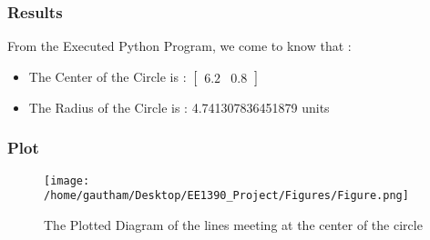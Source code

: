 \documentclass{beamer}
\begin{document}
\begin{frame}
\frametitle{Results}
From the Executed Python Program, we come to know that :
\begin{itemize}
\item<1->The Center of the Circle is : $\begin{bmatrix} 6.2 & 0.8
\end{bmatrix}$
\item<2-> The Radius of the Circle is : 4.741307836451879 units
\end{itemize}\textsl{}
\end{frame}

\begin{frame}
\frametitle{Plot}
\begin{figure}[h]
\centering
\texttt{[image: /home/gautham/Desktop/EE1390\_Project/Figures/Figure.png]}
\caption{The Plotted Diagram of the lines meeting at the center of the circle}
\label{foobar-figure}
\end{figure}

\end{frame}
\end{document}
